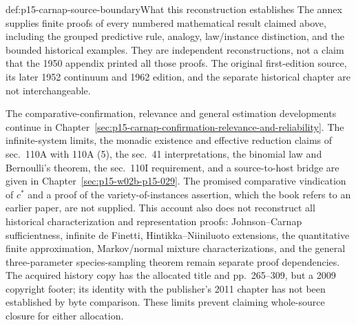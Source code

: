 \begin{proofboundary}{def:p15-carnap-source-boundary}{What this reconstruction establishes}
The annex supplies finite proofs of every numbered mathematical result
claimed above, including the grouped predictive rule, analogy,
law/instance distinction, and the bounded historical examples. They are
independent reconstructions, not a claim that the 1950 appendix printed
all those proofs. The original first-edition source, its later 1952
continuum and 1962 edition, and the separate historical chapter are not
interchangeable.

The comparative-confirmation, relevance and general estimation developments
continue in Chapter~\ref{sec:p15-carnap-confirmation-relevance-and-reliability}.
The infinite-system limits, the monadic existence and effective
reduction claims of sec.~110A with 110A (5), the sec.~41 interpretations,
the binomial law and Bernoulli's theorem, the sec.~110I requirement, and
a source-to-host bridge are given in Chapter~\ref{sec:p15-w02b-p15-029}.
The promised comparative vindication of \(c^*\) and a proof of the
variety-of-instances assertion, which the book refers to an earlier
paper, are not supplied. This account also does not
reconstruct all historical characterization and representation
proofs: Johnson--Carnap sufficientness, infinite de Finetti,
Hintikka--Niiniluoto extensions, the quantitative finite approximation,
Markov/normal mixture characterizations, and the general three-parameter
species-sampling theorem remain separate proof dependencies. The acquired
history copy has the allocated title and pp.~265--309, but a 2009
copyright footer; its identity with the publisher's 2011 chapter has not
been established by byte comparison. These limits prevent claiming
whole-source closure for either allocation.
\end{proofboundary}
